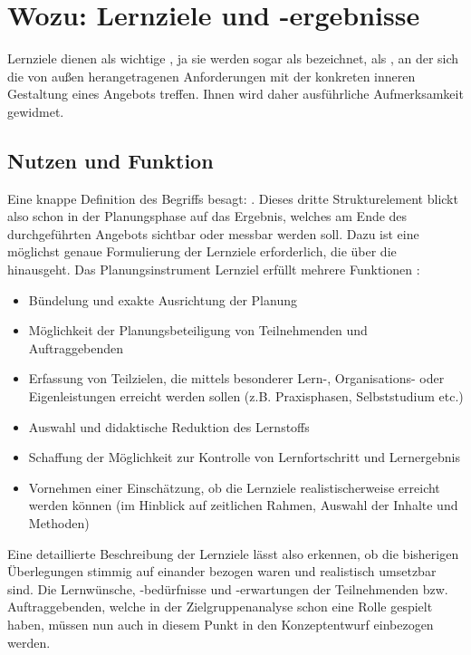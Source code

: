 \documentclass[
  twoside,
  parskip=half-,
  paper=176mm:246mm,
  BCOR=14mm,
  DIV=14,
]{scrreprt}
\begin{document}
\section{Wozu: Lernziele und -ergebnisse}
Lernziele dienen als wichtige , ja sie werden sogar als  bezeichnet, als , an der sich die von außen herangetragenen Anforderungen mit der konkreten inneren Gestaltung eines Angebots treffen. Ihnen wird daher ausführliche Aufmerksamkeit gewidmet.

\subsection{{Nutzen und Funktion}}
 Eine knappe Definition des Begriffs besagt: .
Dieses dritte Strukturelement blickt also schon in der Planungsphase auf das Ergebnis, welches am Ende des durchgeführten Angebots sichtbar oder messbar werden soll. Dazu ist eine möglichst genaue Formulierung der Lernziele erforderlich, die über die  hinausgeht. Das Planungsinstrument Lernziel erfüllt mehrere Funktionen \autocites[96]{schlutz}[vgl. auch][1008]{reich-claassen}:
\begin{itemize}
  \item Bündelung und exakte Ausrichtung der Planung
  \item Möglichkeit der Planungsbeteiligung von Teilnehmenden und Auftraggebenden
  \item Erfassung von Teilzielen, die mittels besonderer Lern-, Organisations- oder Eigenleistungen erreicht werden sollen (z.B. Praxisphasen, Selbststudium etc.)
  \item Auswahl und didaktische Reduktion des Lernstoffs
  \item Schaffung der Möglichkeit zur Kontrolle von Lernfortschritt und Lernergebnis
  \item Vornehmen einer Einschätzung, ob die Lernziele realistischerweise erreicht werden können (im Hinblick auf zeitlichen Rahmen, Auswahl der Inhalte und Methoden)
\end{itemize}

Eine detaillierte Beschreibung der Lernziele lässt also erkennen, ob die bisherigen Überlegungen stimmig auf einander bezogen waren und realistisch umsetzbar sind. Die Lernwünsche, -bedürfnisse und -erwartungen der Teilnehmenden bzw. Auftraggebenden, welche in der Zielgruppenanalyse schon eine Rolle gespielt haben, müssen nun auch in diesem Punkt in den Konzeptentwurf einbezogen werden.
\end{document}

